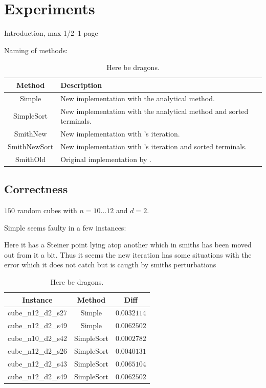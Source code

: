 {
\abnormalparskip{0pt}
\chapter{Experiments}
\label{cha:experiments}
}

Introduction, max 1/2--1 page

Naming of methods:
\begin{table}[htbp]
  \centering
  \begin{tabular}{cp{9cm}}
    \toprule
    Method       & Description                                      \\
    \midrule
    Simple       & New implementation with the analytical method.   \\
    SimpleSort   & New implementation with the analytical method and sorted
                   terminals.                                       \\
    SmithNew     & New implementation with \citeauthor{smith1992}'s
                   iteration.                                       \\
    SmithNewSort & New implementation with \citeauthor{smith1992}'s iteration
                   and sorted terminals.                            \\
    SmithOld     & Original implementation by \textcite{smith1992}. \\
    \bottomrule
  \end{tabular}
  \caption[Here be dragons]{Here be dragons.\label{tab:method-names}}
\end{table}

\section{Correctness}
\label{sec:correctness}

$150$ random cubes with $n = 10 \ldots 12$ and $d = 2$.

Simple seems faulty in a few instances:

Here it has a Steiner point lying atop another which in
smiths has been moved out from it a bit. Thus it seems the new iteration has
some situations with the error which it does not catch but is caugth by smiths
perturbations

\begin{table}[htbp]
  \centering
  \begin{tabular}{ccc}
    \toprule
    Instance           & Method     & Diff        \\
    \midrule
    cube\_n12\_d2\_s27 & Simple     & $0.0032114$ \\
    cube\_n12\_d2\_s49 & Simple     & $0.0062502$ \\
    cube\_n10\_d2\_s42 & SimpleSort & $0.0002782$ \\
    cube\_n12\_d2\_s26 & SimpleSort & $0.0040131$ \\
    cube\_n12\_d2\_s43 & SimpleSort & $0.0065104$ \\
    cube\_n12\_d2\_s49 & SimpleSort & $0.0062502$ \\
    \bottomrule
  \end{tabular}
  \caption[Here be dragons]{Here be dragons.\label{tab:correctness-errors}}
\end{table}

